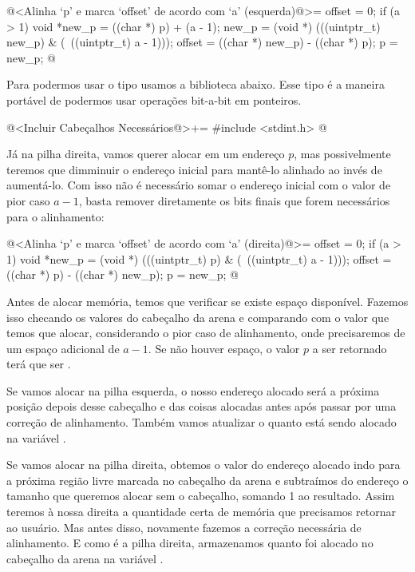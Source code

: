 \iniciocodigo
@<Alinha `p' e marca `offset' de acordo com `a' (esquerda)@>=
offset = 0;
if (a > 1){
  void *new_p = ((char *) p) + (a - 1);
  new_p = (void *) (((uintptr_t) new_p) & (~((uintptr_t) a - 1)));
  offset = ((char *) new_p) - ((char *) p);
  p = new_p;
}
@
\fimcodigo

Para podermos usar o tipo  usamos a biblioteca
abaixo. Esse tipo é a maneira portável de podermos usar operações
bit-a-bit em ponteiros.

\iniciocodigo
@<Incluir Cabeçalhos Necessários@>+=
#include <stdint.h>
@
\fimcodigo


Já na pilha direita, vamos querer alocar em um endereço $p$, mas
possivelmente teremos que dimminuir o endereço inicial para mantê-lo
alinhado ao invés de aumentá-lo. Com isso não é necessário somar
o endereço inicial com o valor de pior caso $a-1$, basta remover
diretamente os bits finais que forem necessários para o alinhamento:

\iniciocodigo
@<Alinha `p' e marca `offset' de acordo com `a' (direita)@>=
offset = 0;
if (a > 1){
  void *new_p = (void *) (((uintptr_t) p) & (~((uintptr_t) a - 1)));
  offset = ((char *) p) - ((char *) new_p);
  p = new_p;
}
@
\fimcodigo


Antes de alocar memória, temos que verificar se existe espaço
disponível. Fazemos isso checando os valores do cabeçalho da arena
e comparando com o valor que temos que alocar, considerando o pior
caso de alinhamento, onde precisaremos de um espaço adicional de
$a-1$. Se não houver espaço, o valor $p$ a ser retornado terá que ser
.

Se vamos alocar na pilha esquerda, o nosso endereço alocado será a
próxima posição depois desse cabeçalho e das coisas alocadas antes
após passar por uma correção de alinhamento. Também vamos atualizar o
quanto está sendo alocado na variável .

Se vamos alocar na pilha direita, obtemos o valor do endereço alocado
indo para a próxima região livre marcada no cabeçalho da arena e
subtraímos do endereço o tamanho que queremos alocar sem o cabeçalho,
somando 1 ao resultado. Assim teremos à nossa direita a quantidade
certa de memória que precisamos retornar ao usuário. Mas antes disso,
novamente fazemos a correção necessária de alinhamento. E como é a
pilha direita, armazenamos quanto foi alocado no cabeçalho da arena na
variável .


